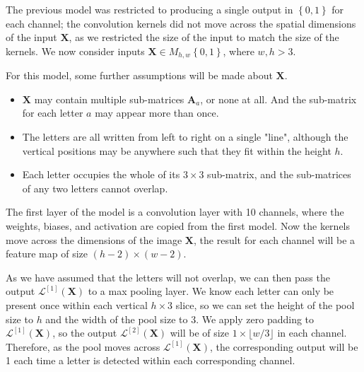 \documentclass{somasmsc}
\begin{document}
The previous model was restricted to producing a single output in $\left\{0,1\right\}$ for each channel; the convolution kernels did not move across the spatial dimensions of the input $\mathbf{X}$, as we restricted the size of the input to match the size of the kernels. We now consider inputs $\mathbf{X} \in M_{h,w}\left\{0,1\right\}$, where $w,h > 3$.

For this model, some further assumptions will be made about $\mathbf{X}$.
\begin{itemize}
    \item $\mathbf{X}$ may contain multiple sub-matrices $\mathbf{A}_a$, or none at all. And the sub-matrix for each letter $a$ may appear more than once.
    \item The letters are all written from left to right on a single "line", although the vertical positions may be anywhere such that they fit within the height $h$.
    \item Each letter occupies the whole of its $3 \times 3$ sub-matrix, and the sub-matrices of any two letters cannot overlap.
\end{itemize}

The first layer of the model is a convolution layer with 10 channels, where the weights, biases, and activation are copied from the first model. Now the kernels move across the dimensions of the image $\mathbf{X}$, the result for each channel will be a feature map of size $\left(h - 2\right) \times \left(w - 2\right)$.

As we have assumed that the letters will not overlap, we can then pass the output $\mathcal{L}^{\left[1\right]}\left(\mathbf{X}\right)$ to a max pooling layer. We know each letter can only be present once within each vertical $h \times 3$ slice, so we can set the height of the pool size to $h$ and the width of the pool size to 3. We apply zero padding to $\mathcal{L}^{\left[1\right]}\left(\mathbf{X}\right)$, so the output $\mathcal{L}^{\left[2\right]}\left(\mathbf{X}\right)$ will be of size $1 \times \lfloor w/3 \rfloor$ in each channel. Therefore, as the pool moves across $\mathcal{L}^{\left[1\right]}\left(\mathbf{X}\right)$, the corresponding output will be 1 each time a letter is detected within each corresponding channel.
\end{document}
